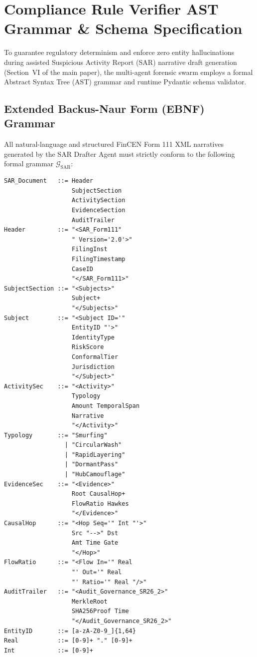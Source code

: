 \section{Compliance Rule Verifier AST Grammar \& Schema Specification}
\label{sec:appendix_ast}

To guarantee regulatory determinism and enforce zero entity hallucinations during assisted Suspicious Activity Report (SAR) narrative draft generation (Section~VI of the main paper), the multi-agent forensic swarm employs a formal Abstract Syntax Tree (AST) grammar and runtime Pydantic schema validator. 

\subsection{Extended Backus-Naur Form (EBNF) Grammar}
All natural-language and structured FinCEN Form 111 XML narratives generated by the SAR Drafter Agent must strictly conform to the following formal grammar $\mathcal{G}_{\text{SAR}}$:

\begin{scriptsize}
\begin{verbatim}
SAR_Document   ::= Header
                   SubjectSection
                   ActivitySection 
                   EvidenceSection
                   AuditTrailer
Header         ::= "<SAR_Form111"
                   " Version='2.0'>"
                   FilingInst
                   FilingTimestamp
                   CaseID
                   "</SAR_Form111>"
SubjectSection ::= "<Subjects>"
                   Subject+
                   "</Subjects>"
Subject        ::= "<Subject ID='"
                   EntityID "'>"
                   IdentityType
                   RiskScore
                   ConformalTier 
                   Jurisdiction
                   "</Subject>"
ActivitySec    ::= "<Activity>" 
                   Typology
                   Amount TemporalSpan 
                   Narrative
                   "</Activity>"
Typology       ::= "Smurfing"
                 | "CircularWash"
                 | "RapidLayering" 
                 | "DormantPass"
                 | "HubCamouflage"
EvidenceSec    ::= "<Evidence>" 
                   Root CausalHop+
                   FlowRatio Hawkes
                   "</Evidence>"
CausalHop      ::= "<Hop Seq='" Int "'>"
                   Src "-->" Dst 
                   Amt Time Gate
                   "</Hop>"
FlowRatio      ::= "<Flow In='" Real 
                   "' Out='" Real
                   "' Ratio='" Real "/>"
AuditTrailer   ::= "<Audit_Governance_SR26_2>" 
                   MerkleRoot
                   SHA256Proof Time 
                   "</Audit_Governance_SR26_2>"
EntityID       ::= [a-zA-Z0-9_]{1,64}
Real           ::= [0-9]+ "." [0-9]+
Int            ::= [0-9]+
\end{verbatim}
\end{scriptsize}

